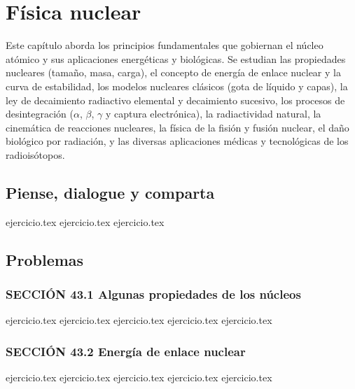 \chapter{Física nuclear}
\label{cap:fisica_nuclear}

Este capítulo aborda los principios fundamentales que gobiernan el núcleo atómico y sus aplicaciones energéticas y biológicas. Se estudian las propiedades nucleares (tamaño, masa, carga), el concepto de energía de enlace nuclear y la curva de estabilidad, los modelos nucleares clásicos (gota de líquido y capas), la ley de decaimiento radiactivo elemental y decaimiento sucesivo, los procesos de desintegración ($\alpha$, $\beta$, $\gamma$ y captura electrónica), la radiactividad natural, la cinemática de reacciones nucleares, la física de la fisión y fusión nuclear, el daño biológico por radiación, y las diversas aplicaciones médicas y tecnológicas de los radioisótopos.

\section*{Piense, dialogue y comparta}
\begin{enumerate}
    {ejercicio.tex}
    {ejercicio.tex}
    {ejercicio.tex}
\end{enumerate}

\section*{Problemas}

\subsection*{SECCIÓN 43.1 Algunas propiedades de los núcleos}
\begin{enumerate}
    {ejercicio.tex}
    {ejercicio.tex}
    {ejercicio.tex}
    {ejercicio.tex}
    {ejercicio.tex}
\end{enumerate}

\subsection*{SECCIÓN 43.2 Energía de enlace nuclear}
\begin{enumerate}
    \setcounter{enumi}{5}
    {ejercicio.tex}
    {ejercicio.tex}
    {ejercicio.tex}
    {ejercicio.tex}
    {ejercicio.tex}
\end{enumerate}

